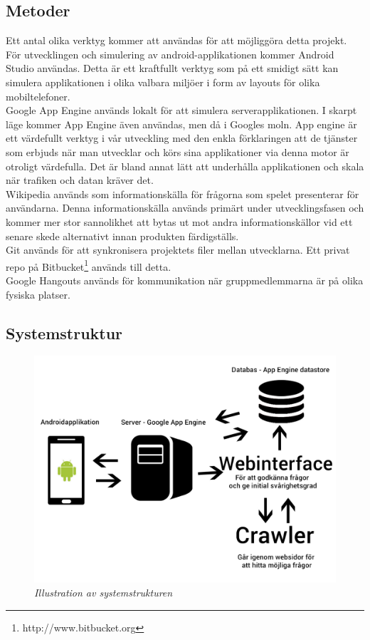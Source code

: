 \documentclass[12pt,a4paper]{article}
\begin{document}
\subsection{Metoder}
Ett antal olika verktyg kommer att användas för att möjliggöra detta projekt. För utvecklingen och simulering av android-applikationen kommer Android Studio användas. Detta är ett kraftfullt verktyg som på ett smidigt sätt kan simulera applikationen i olika valbara miljöer i form av layouts för olika mobiltelefoner. \cite{androidstudio}\\
Google App Engine används lokalt för att simulera serverapplikationen. I skarpt läge kommer App Engine även användas, men då i Googles moln. App engine är ett värdefullt verktyg i vår utveckling med den enkla förklaringen att de tjänster som erbjuds när man utvecklar och körs sina applikationer via denna motor är otroligt värdefulla. Det är bland annat lätt att underhålla applikationen och skala när trafiken och datan kräver det. \cite{googleappengine}\\
Wikipedia används som informationskälla för frågorna som spelet presenterar för användarna. Denna informationskälla används primärt under utvecklingsfasen och kommer mer stor sannolikhet att bytas ut mot andra informationskällor vid ett senare skede alternativt innan produkten färdigställs.\\
Git används för att synkronisera projektets filer mellan utvecklarna. Ett privat repo på Bitbucket\footnote{http://www.bitbucket.org} används till detta.\\
Google Hangouts används för kommunikation när gruppmedlemmarna är på olika fysiska platser.

\subsection{Systemstruktur}

\begin{figure}[H]
	\begin{centering}
	\includegraphics[width = \textwidth]{systemstruktur.jpg} 
	\end{centering}
	\caption{\textit{Illustration av systemstrukturen}}
\end{figure} 
\end{document}
